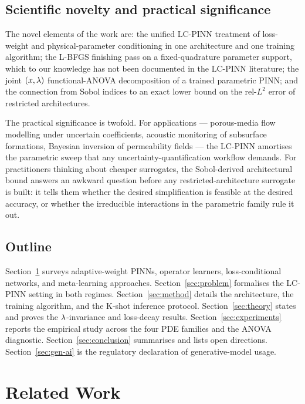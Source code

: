 \documentclass[12pt,a4paper]{extarticle}
\begin{document}
\subsection{Scientific novelty and practical significance}

The novel elements of the work are: the unified LC-PINN treatment of loss-weight and physical-parameter conditioning in one architecture and one training algorithm; the L-BFGS finishing pass on a fixed-quadrature parameter support, which to our knowledge has not been documented in the LC-PINN literature; the joint $(x, \lambda)$ functional-ANOVA decomposition of a trained parametric PINN; and the connection from Sobol indices to an exact lower bound on the rel-$L^2$ error of restricted architectures.

The practical significance is twofold. For applications --- porous-media flow modelling under uncertain coefficients, acoustic monitoring of subsurface formations, Bayesian inversion of permeability fields --- the LC-PINN amortises the parametric sweep that any uncertainty-quantification workflow demands. For practitioners thinking about cheaper surrogates, the Sobol-derived architectural bound answers an awkward question before any restricted-architecture surrogate is built: it tells them whether the desired simplification is feasible at the desired accuracy, or whether the irreducible interactions in the parametric family rule it out.

\subsection{Outline}

Section~\ref{sec:related} surveys adaptive-weight PINNs, operator learners, loss-conditional networks, and meta-learning approaches. Section~\ref{sec:problem} formalises the LC-PINN setting in both regimes. Section~\ref{sec:method} details the architecture, the training algorithm, and the K-shot inference protocol. Section~\ref{sec:theory} states and proves the $\lambda$-invariance and loss-decay results. Section~\ref{sec:experiments} reports the empirical study across the four PDE families and the ANOVA diagnostic. Section~\ref{sec:conclusion} summarises and lists open directions. Section~\ref{sec:gen-ai} is the regulatory declaration of generative-model usage.

\newpage

\section{Related Work}
\label{sec:related}
\end{document}
